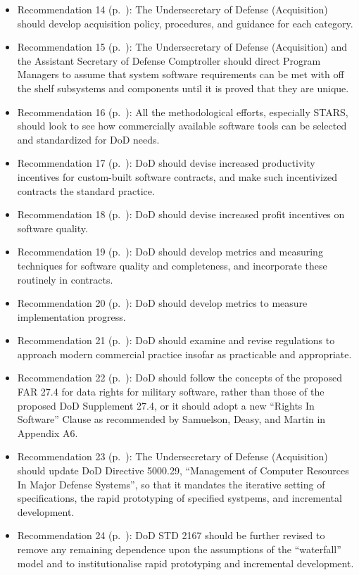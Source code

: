 \documentclass[11pt,final]{article}
\begin{document}
\begin{itemize}
    \item Recommendation 14 (p.~\pageref{rec:14}): The Undersecretary of Defense (Acquisition) should develop acquisition policy, procedures, and guidance for each category.
    \item Recommendation 15 (p.~\pageref{rec:15}): The Undersecretary of Defense (Acquisition) and the Assistant Secretary of Defense Comptroller should direct Program Managers to assume that system software requirements can be met with off the shelf subsystems and components until it is proved that they are unique.
    \item Recommendation 16 (p.~\pageref{rec:16}): All the methodological efforts, especially STARS, should look to see how commercially available software tools can be selected and standardized for DoD needs.
    \item Recommendation 17 (p.~\pageref{rec:17}): DoD should devise increased productivity incentives for custom-built software contracts, and make such incentivized contracts the standard practice.
    \item Recommendation 18 (p.~\pageref{rec:18}): DoD should devise increased profit incentives on software quality.
    \item Recommendation 19 (p.~\pageref{rec:19}): DoD should develop metrics and measuring techniques for software quality and completeness, and incorporate these routinely in contracts.
    \item Recommendation 20 (p.~\pageref{rec:20}): DoD should develop metrics to measure implementation progress.
    \item Recommendation 21 (p.~\pageref{rec:21}): DoD should examine and revise regulations to approach modern commercial practice insofar as practicable and appropriate.
    \item Recommendation 22 (p.~\pageref{rec:22}): DoD should follow the concepts of the proposed FAR 27.4 for data rights for military software, rather than those of the proposed DoD Supplement 27.4, or it should adopt a new “Rights In Software” Clause as recommended by Samuelson, Deasy, and Martin in Appendix A6.
    \item Recommendation 23 (p.~\pageref{rec:23}): The Undersecretary of Defense (Acquisition) should update DoD Directive 5000.29, “Management of Computer Resources In Major Defense Systems”, so that it mandates the iterative setting of specifications, the rapid prototyping of specified systpems, and incremental development.
    \item Recommendation 24 (p.~\pageref{rec:24}): DoD STD 2167 should be further revised to remove any remaining dependence upon the assumptions of the “waterfall” model and to institutionalise rapid prototyping and incremental development.

\end{itemize}
\end{document}

